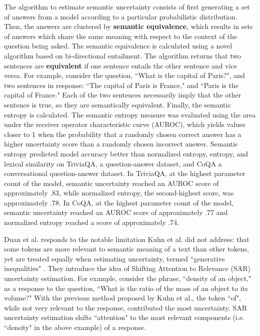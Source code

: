 \documentclass[letterpaper,12pt]{article}
\begin{document}
The algorithm to estimate semantic uncertainty consists of first generating a set of answers from a model according to a particular probabilistic distribution. Then, the answers are clustered by \textbf{semantic equivalence}, which results in sets of answers which share the same meaning with respect to the context of the question being asked. The semantic equivalence is calculated using a novel algorithm based on bi-directional entailment. The algorithm returns that two sentences are \textbf{equivalent} if one sentence entails the other sentence and vice versa. For example, consider the question, ``What is the capital of Paris?", and two sentences in response: ``The capital of Paris is France," and ``Paris is the capital of France." Each of the two sentences necessarily imply that the other sentence is true, so they are semantically equivalent. Finally, the semantic entropy is calculated. The semantic entropy measure was evaluated using the area under the receiver operator characteristic curve (AUROC), which yields values closer to 1 when the probability that a randomly chosen correct answer has a higher uncertainty score  than a randomly chosen incorrect answer. Semantic entropy predicted model accuracy better than normalized entropy, entropy, and lexical similarity on TriviaQA, a question-answer dataset, and CoQA a conversational question-answer dataset. In TriviaQA, at the highest parameter count of the model, semantic uncertainty reached an AUROC score of approximately .83, while normalized entropy, the second-highest score, was approximately .78. In CoQA, at the highest parameter count of the model, semantic uncertainty reached an AUROC score of approximately .77 and normalized entropy reached a score of approximately .74.

Duan et al. responds to the notable limitation Kuhn et al. did not address: that some tokens are more relevant to semantic meaning of a text than other tokens, yet are treated equally when estimating uncertainty, termed ``generative inequalities" \cite{duan2023shifting}. They introduce the idea of Shifting Attention to Relevance (SAR) uncertainty estimation. For example, consider the phrase, ``density of an object," as a response to the question, ``What is the ratio of the mass of an object to its volume?" With the previous method proposed by Kuhn et al., the token ``of", while not very relevant to the response, contributed the most uncertainty. SAR uncertainty estimation shifts ``attention" to the most relevant components (i.e. ``density" in the above example) of a response.
\end{document}
